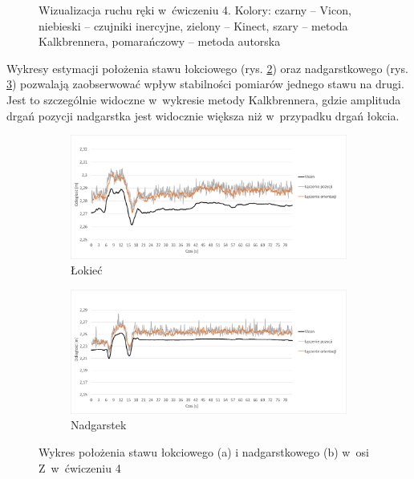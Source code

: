 \begin{savenotes}
\begin{figure}[!htb]
		\caption[Wizualizacja ruchu ręki w~ćwiczeniu 4]{Wizualizacja ruchu ręki w~ćwiczeniu 4.  Kolory: czarny -- Vicon, niebieski -- czujniki inercyjne, zielony -- Kinect, szary -- metoda Kalkbrennera, pomarańczowy -- metoda autorska}	
		\label{fig:experiments:four}
	\end{figure}
\end{savenotes}
																						
Wykresy estymacji położenia stawu łokciowego (rys. \ref{fig:experiments:four:elbowZ}) oraz nadgarstkowego (rys. \ref{fig:experiments:four:wristZ}) pozwalają zaobserwować wpływ stabilności pomiarów jednego stawu na drugi. Jest to szczególnie widoczne w~wykresie metody Kalkbrennera, gdzie amplituda drgań pozycji nadgarstka jest widocznie większa niż w~przypadku drgań łokcia. 
																						
\begin{savenotes}
	\begin{figure}[!htb]
		\centering
		\begin{subfigure}[b]{0.65\textwidth}
			\centering
			\includegraphics[width=\linewidth]{images/400/3.png}		
			\caption{Łokieć}
			\label{fig:experiments:four:elbowZ}
		\end{subfigure}
		\begin{subfigure}[b]{0.65\textwidth}
			\centering
			\includegraphics[width=\linewidth]{images/400/6.png}		
			\caption{Nadgarstek}
			\label{fig:experiments:four:wristZ}
		\end{subfigure}
		\caption[Wykres położenia stawu łokciowego i nadgarstkowego w~osi Z~w~ćwiczeniu 4]{Wykres położenia stawu łokciowego (a) i nadgarstkowego (b) w~osi Z~w~ćwiczeniu 4}	
		\label{fig:experiments:four:Zaxis}
	\end{figure}
\end{savenotes}
																								
